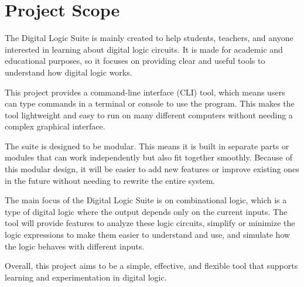 \clearpage
\section{Project Scope}

The Digital Logic Suite is mainly created to help students, teachers, and anyone interested in learning about digital logic circuits. It is made for academic and educational purposes, so it focuses on providing clear and useful tools to understand how digital logic works.

This project provides a command-line interface (CLI) tool, which means users can type commands in a terminal or console to use the program. This makes the tool lightweight and easy to run on many different computers without needing a complex graphical interface.

The suite is designed to be modular. This means it is built in separate parts or modules that can work independently but also fit together smoothly. Because of this modular design, it will be easier to add new features or improve existing ones in the future without needing to rewrite the entire system.

The main focus of the Digital Logic Suite is on combinational logic, which is a type of digital logic where the output depends only on the current inputs. The tool will provide features to analyze these logic circuits, simplify or minimize the logic expressions to make them easier to understand and use, and simulate how the logic behaves with different inputs.

Overall, this project aims to be a simple, effective, and flexible tool that supports learning and experimentation in digital logic.

